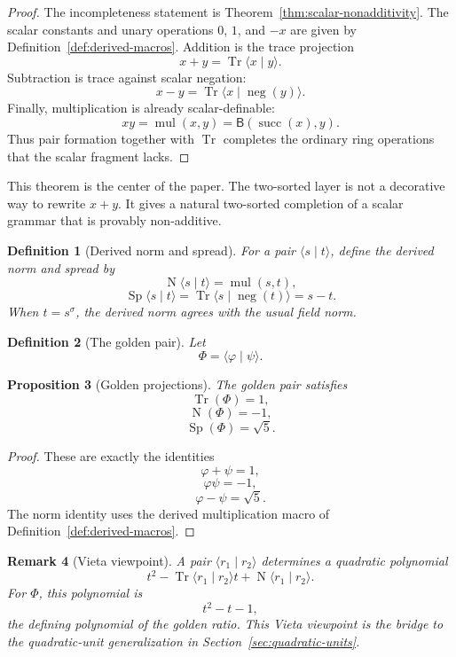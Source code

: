 \documentclass[11pt]{article}
\newtheorem{definition}{Definition}[section]
\newtheorem{proposition}[definition]{Proposition}
\newtheorem{remark}[definition]{Remark}
\newcommand{\B}{\mathsf{B}}
\newcommand{\Tr}{\operatorname{Tr}}
\newcommand{\Nm}{\operatorname{N}}
\newcommand{\Sp}{\operatorname{Sp}}
\newcommand{\sig}{\sigma}
\newcommand{\ph}{\varphi}
\newcommand{\ps}{\psi}
\begin{document}
\begin{proof}
The incompleteness statement is Theorem~\ref{thm:scalar-nonadditivity}.  The scalar constants and unary operations $0$, $1$, and $-x$ are given by Definition~\ref{def:derived-macros}.  Addition is the trace projection
\[
    x+y=\Tr\langle x\mid y\rangle.
\]
Subtraction is trace against scalar negation:
\[
    x-y=\Tr\langle x\mid \operatorname{neg}(y)\rangle.
\]
Finally, multiplication is already scalar-definable:
\[
    xy=\operatorname{mul}(x,y)=\B(\operatorname{succ}(x),y).
\]
Thus pair formation together with $\Tr$ completes the ordinary ring operations that the scalar fragment lacks.
\end{proof}

This theorem is the center of the paper.  The two-sorted layer is not a decorative way to rewrite $x+y$.  It gives a natural two-sorted completion of a scalar grammar that is provably non-additive.

\begin{definition}[Derived norm and spread]
For a pair $\langle s\mid t\rangle$, define the derived norm and spread by
\[
    \Nm\langle s\mid t\rangle=\operatorname{mul}(s,t),
\]
\[
    \Sp\langle s\mid t\rangle=\Tr\langle s\mid \operatorname{neg}(t)\rangle=s-t.
\]
When $t=s^\sig$, the derived norm agrees with the usual field norm.
\end{definition}

\begin{definition}[The golden pair]
Let
\[
    \Phi=\langle\ph\mid\ps\rangle.
\]
\end{definition}

\begin{proposition}[Golden projections]
The golden pair satisfies
\[
    \Tr(\Phi)=1,
\]
\[
    \Nm(\Phi)=-1,
\]
\[
    \Sp(\Phi)=\sqrt5.
\]
\end{proposition}

\begin{proof}
These are exactly the identities
\[
    \ph+\ps=1,
\]
\[
    \ph\ps=-1,
\]
\[
    \ph-\ps=\sqrt5.
\]
The norm identity uses the derived multiplication macro of Definition~\ref{def:derived-macros}.
\end{proof}

\begin{remark}[Vieta viewpoint]\label{rem:vieta}
A pair $\langle r_1\mid r_2\rangle$ determines a quadratic polynomial
\[
    t^2-\Tr\langle r_1\mid r_2\rangle t+\Nm\langle r_1\mid r_2\rangle.
\]
For $\Phi$, this polynomial is
\[
    t^2-t-1,
\]
the defining polynomial of the golden ratio.  This Vieta viewpoint is the bridge to the quadratic-unit generalization in Section~\ref{sec:quadratic-units}.
\end{remark}
\end{document}
